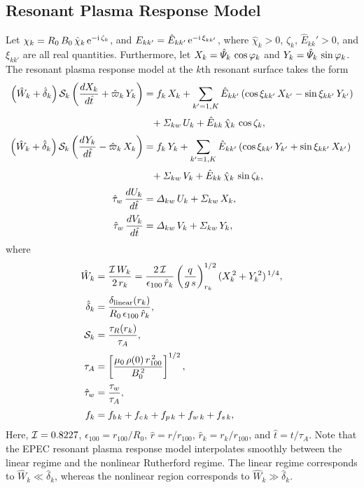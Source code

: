 \documentclass[notitlepage,12pt]{article}
\begin{document}
\subsection{Resonant Plasma Response Model}
Let ${\mit\chi}_k= R_0\,B_0\,\hat{\chi}_k\,{\rm e}^{-{\rm i}\,\zeta_k}$, and $E_{kk'}=\hat{E}_{kk'}\,{\rm e}^{-{\rm i}\,\xi_{kk'}}$,
where  $\hat{\chi}_k>0$, $\zeta_k$, $\hat{E}_{kk}'>0$, and $\xi_{kk'}$ are all real quantities. Furthermore,
let $X_k= \hat{\mit\Psi}_k\,\cos\varphi_k$ and $Y_k= \hat{\mit\Psi}_k\,\sin\varphi_k$. The resonant plasma response model at the 
$k$th resonant surface takes the form
\begin{align}\label{e21}
\left(\hat{W}_k +\hat{\delta}_k\right){\cal S}_k\left(\frac{dX_k}{d\hat{t}} 
+\hat{\varpi}_k\,Y_k\right)&= f_k\,X_k+ \sum_{k'=1,K}\hat{E}_{kk'}\,(\cos\xi_{kk'}\,X_{k'}  -\sin\xi_{kk'}\,Y_{k'})\nonumber\\[0.5ex] &\phantom{=}+ {\mit\Sigma}_{kw}\,U_k + \hat{E}_{kk}\,\hat{\chi}_k\,\cos\zeta_k,\\[0.5ex]
\left(\hat{W}_k +\hat{\delta}_k\right){\cal S}_k\left(\frac{dY_k}{d\hat{t}} -\hat{\varpi}_k\,X_k\right)
&= f_k\,Y_k + \sum_{k'=1,K}\hat{E}_{kk'}\,(\cos\xi_{kk'}\,Y_{k'}
+\sin\xi_{kk'}\,X_{k'}) \nonumber\\[0.5ex]
&\phantom{=}+ {\mit\Sigma}_{kw}\,V_k+ \hat{E}_{kk}\,\hat{\chi}_k\,\sin\zeta_k,\label{e22}\\[0.5ex]
\hat{\tau}_w\,\frac{dU_k}{d\hat{t}} &={\mit\Delta}_{kw}\, U_k+ {\mit\Sigma}_{kw}\,X_k,\\[0.5ex]
\hat{\tau}_w\,\frac{dV_k}{d\hat{t}} &={\mit\Delta}_{kw}\, V_k+ {\mit\Sigma}_{kw}\,Y_k,
\end{align}
where
\begin{align}\label{e23}
\hat{W}_k &=\frac{{\cal I}\,W_k}{2\,r_k}=\frac{2\,{\cal I}}{\epsilon_{100}\,\hat{r}_k}\left(\frac{q}{g\,s}\right)^{1/2}_{r_k} (X_k^{\,2} + Y_k^{\,2})^{\,1/4},\\[0.5ex]
\hat{\delta}_k &= \frac{\delta_{\rm linear}(r_k)}{R_0\,\epsilon_{100}\,\hat{r}_k},\\[0.5ex]
{\cal S}_k&=\frac{\tau_R(r_k)}{\tau_A},\\[0.5ex]
\tau_A &= \left[\frac{\mu_0\,\rho(0)\,r_{100}^{\,2}}{B_0^{\,2}}\right]^{1/2},\\[0.5ex]
\hat{\tau}_w &= \frac{\tau_w}{\tau_A},\\[0.5ex]
f_k &=f_{b\,k}+f_{c\,k} + f_{p\,k} + f_{w\,k} + f_{s\,k},
\end{align}
Here, ${\cal I} = 0.8227$, $\epsilon_{100}=r_{100}/R_0$, $\hat{r}=r/r_{100}$, $\hat{r}_k=r_k/r_{100}$, and $\hat{t}=t/\tau_A$. Note that the EPEC resonant plasma response model interpolates smoothly
between the linear regime and the
nonlinear Rutherford regime. The linear regime corresponds to $\hat{W}_k\ll\hat{\delta}_k$, whereas the nonlinear
region corresponds to $\hat{W}_k\gg\hat{\delta}_k$.  
\end{document}
